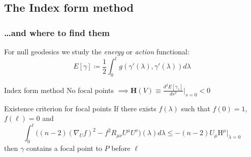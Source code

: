 \documentclass[]{beamer}
\begin{document}
	\subsection{The Index form method}
	\begin{frame}
		\frametitle{\ldots and where to find them}
		For null geodesics we study the \emph{energy} or \emph{action} functional:
		\[
			E[\gamma] \coloneqq \frac{1}{2}\int_{0}^{l} g(\gamma'(\lambda), \gamma'(\lambda))d\lambda	
		\]
		\begin{ideablock}{Index form method}
			\centering
			No focal points \(\implies \textbf{H}(V) \equiv\frac{d^2E[\gamma_s]}{ds^2}\Big\vert_{s = 0} < 0\)
		\end{ideablock}
	
		\begin{theoblock}{Existence criterion for focal points}
			If there exists \(f(\lambda)\) such that \(f(0) = 1\), \(f(\ell) = 0\) and
			\[
				\int_{0}^{\ell} \big((n -2)(\nabla_Uf)^2 - f^2R_{\mu\nu}U^{\mu}U^{\nu} \big)(\lambda) d\lambda\le -(n-2)U_{\mu}\mathrm{H}^{\mu}\Big\vert_{\lambda = 0}	
			\]
			then \(\gamma\) contains a focal point to \(P\) before \(\ell\)
		\end{theoblock}
	\end{frame}
\end{document}
